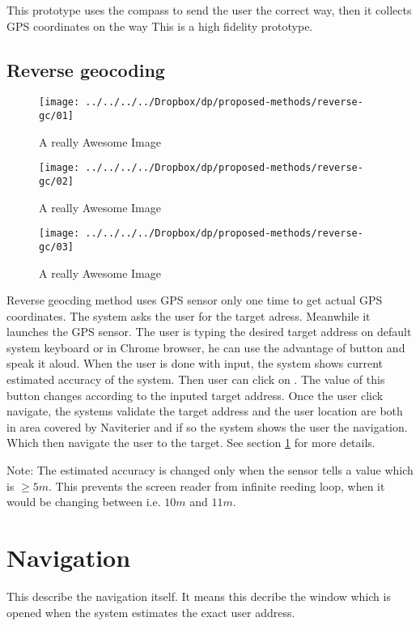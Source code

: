 \documentclass[11pt,oneside,a4paper]{book}
\begin{document}
				This prototype uses the compass to send the user the correct way, then it collects GPS coordinates on the way
				This is a high fidelity prototype.
			\subsection{Reverse geocoding}
		
			\begin{figure}[!htb]
				\texttt{[image: ../../../../Dropbox/dp/proposed-methods/reverse-gc/01]}
				\caption{A really Awesome Image}\label{fig:awesome_image1}
				\endminipage\hfill
				\texttt{[image: ../../../../Dropbox/dp/proposed-methods/reverse-gc/02]}
				\caption{A really Awesome Image}\label{fig:awesome_image2}
				\endminipage\hfill
				\texttt{[image: ../../../../Dropbox/dp/proposed-methods/reverse-gc/03]}
				\caption{A really Awesome Image}\label{fig:awesome_image3}
				\endminipage
			\end{figure}
	
			Reverse geocding method uses GPS sensor only one time to get actual GPS coordinates. 
			The system asks the user for the target adress. Meanwhile it launches the GPS sensor.
			The user is typing the desired target address on default system keyboard or in Chrome browser, he can use the advantage of button  and speak it aloud.
			When the user is done with input, the system shows current estimated accuracy of the system.
			Then user can click on . The value of this button changes according to the inputed target address.
			Once the user click navigate, the systems validate the target address and the user location are both in area covered by Naviterier and if so the system shows the user the navigation. Which then navigate the user to the target. See section \ref{sec:navifation} for more details.
			
			Note: The estimated accuracy is changed only when the sensor tells a value which is $\geq 5m$. This prevents the screen reader from infinite reeding loop, when it would be changing between i.e. $10m$ and $11m$. 
		\section{Navigation}
		\label{sec:navifation}
		This describe the navigation itself. It means this decribe the window which is opened when the system estimates the exact user address.
\end{document}
